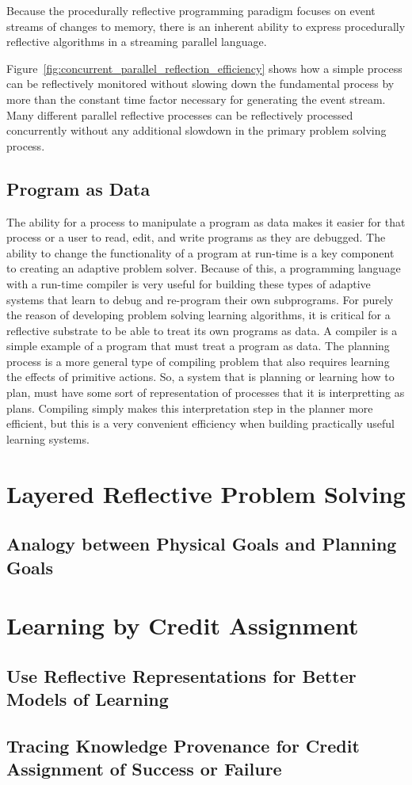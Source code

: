 Because the procedurally reflective programming paradigm focuses on
event streams of changes to memory, there is an inherent ability to
express procedurally reflective algorithms in a streaming parallel
language.

Figure~\ref{fig:concurrent_parallel_reflection_efficiency} shows how a
simple process can be reflectively monitored without slowing down the
fundamental process by more than the constant time factor necessary
for generating the event stream.  Many different parallel reflective
processes can be reflectively processed concurrently without any
additional slowdown in the primary problem solving process.

\subsection{Program as Data}

The ability for a process to manipulate a program as data makes it
easier for that process or a user to read, edit, and write programs as
they are debugged.  The ability to change the functionality of a
program at run-time is a key component to creating an adaptive problem
solver.  Because of this, a programming language with a run-time
compiler is very useful for building these types of adaptive systems
that learn to debug and re-program their own subprograms.  For purely
the reason of developing problem solving learning algorithms, it is
critical for a reflective substrate to be able to treat its own
programs as data.  A compiler is a simple example of a program that
must treat a program as data.  The planning process is a more general
type of compiling problem that also requires learning the effects of
primitive actions.  So, a system that is planning or learning how to
plan, must have some sort of representation of processes that it is
interpretting as plans.  Compiling simply makes this interpretation
step in the planner more efficient, but this is a very convenient
efficiency when building practically useful learning systems.


\section{Layered Reflective Problem Solving}




\subsection{Analogy between Physical Goals and Planning Goals}


\section{Learning by Credit Assignment}

\subsection{Use Reflective Representations for Better Models of Learning}

\subsection{Tracing Knowledge Provenance for Credit Assignment of Success or Failure}



